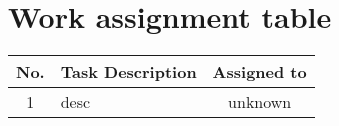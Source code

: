 \section{Work assignment table}
\begin{center}
  \renewcommand{\arraystretch}{1.5}
  \begin{tabular}{|c|p{}|c|}
    \hline
    \textbf{No.} & \textbf{Task Description} & \textbf{Assigned to} \\\hline
    1            & desc                      & unknown              \\\hline
  \end{tabular}
\end{center}
